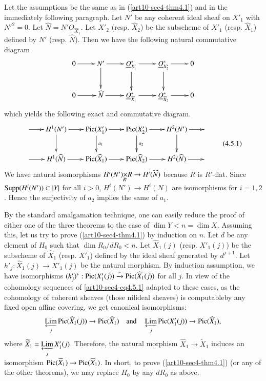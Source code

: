 \begin{remark}\label{art10-sec4-rem4.5}
Let the assumptions be the same as in (\ref{art10-sec4-thm4.1}) and in the immediately following paragraph. Let $N'$ be any coherent ideal sheaf on $X'_{1}$ with ${N'}^{2}=0$. Let $\widehat{N}=N'\underline{O}_{\widehat{X}_{1}}$. Let $X'_{2}$ (resp. $\widehat{X}_{2}$) be the subscheme of $X'_{1}$ (resp. $\widehat{X}_{1}$) defined by $N'$ (resp. $\widehat{N}$). Then we have the following natural commutative diagram
\[
\xymatrix{
0\ar[r] & N'\ar[d] \ar[r] & \underline{O}^{*}_{X'_{1}}\ar[d] \ar[r] & \underline{O}^{*}_{X'_{2}}\ar[d]\ar[r] & 0\\
0\ar[r] & \widehat{N}\ar[r] & \underline{O}^{*}_{\widehat{X}_{1}}\ar[r] & \underline{O}^{*}_{\widehat{X}_{2}}\ar[r] & 0
}
\]
which yields the following exact and commutative diagram.
\begin{equation*}
\vcenter{\xymatrix@C=.72cm{
\ar[r] & H^{1}(N')\ar[d]\ar[r] & \Pic(X'_{1})\ar[d]^-{a_{1}}\ar[r] & \Pic(X'_{2})\ar[d]^-{a_{2}}\ar[r] & H^{2}(N')\ar[d]\ar[r] &\\
\ar[r] & H^{1}(\widehat{N})\ar[r] & \Pic(\widehat{X}_{1})\ar[r] & \Pic(\widehat{X}_{2})\ar[r] & H^{2}(\widehat{N})\ar[r] & 
}}\tag{4.5.1}\label{art10-sec4-eq4.5.1}
\end{equation*}
We have natural isomorphisms $\fprod{H^{i}(N')}{R}{R'}\to H^{i}(\widehat{N})$ because $R$ is $R'$-flat. Since $\operatorname{\mathrm{Supp}} (H^{i}(N'))\subset |Y|$ for all $i>0$, $H^{i}(N')\to H^{i}(N)$ are isomorphisms for $i=1,2$. Hence the surjectivity of $a_{2}$ implies the same of $a_{1}$.
\end{remark}

\begin{remark}\label{art10-sec4-rem4.6}
By the standard amalgamation technique, one can easily reduce the proof of either one of the three theorems to the case of $\dim Y<n=\dim X$. Assuming this, let us try to prove (\ref{art10-sec4-thm4.1}) by induction on $n$. Let $d$ be any element of $H_{0}$ such that $\dim R_{0}/dR_{0}<n$. Let $\widehat{X}_{1}(j)$ (resp. $X'_{1}(j)$) be the subscheme of $\widehat{X}_{1}$ (resp. $X'_{1}$) defined by the ideal sheaf generated by $d^{j+1}$. Let $h'_{j}:\widehat{X}_{1}(j)\to X'_{1}(j)$ be the natural morphism. By induction assumption, we have isomorphisms $(h'_{j})^{*}:\operatorname{\mathrm{Pic}}(X'_{1}(j))\xrightarrow{\sim}\operatorname{\mathrm{Pic}}(\widehat{X}_{1}(j))$ for all $j$. In view of the cohomology sequences of \eqref{art10-sec4-eq4.5.1} adapted to these cases, as the cohomology of coherent sheaves (those nilideal sheaves) is computable\pageoriginale by any fixed open affine covering, we get canonical isomorphisms:
$$
\operatorname*{\underleftarrow{\mathrm{Lim}}}\limits_{j} \operatorname{\mathrm{Pic}}(\widehat{X}_{1}(j))\to \operatorname{\mathrm{Pic}} (\widehat{X}_{1})\quad\text{and}\quad \operatorname*{\underleftarrow{\mathrm{Lim}}}_{j}\operatorname{\mathrm{Pic}} (X'_{1}(j))\to \operatorname{\mathrm{Pic}}(\widehat{X}_{1}),
$$
where $\widetilde{X}_{1}=\operatorname*{\underleftarrow{\mathrm{Lim}}}\limits_{j}X'_{1}(j)$. Therefore, the natural morphism $\widehat{X}_{1}\to \widetilde{X}_{1}$ induces an isomorphism $\operatorname{\mathrm{Pic}} (\widetilde{X}_{1})\to \operatorname{\mathrm{Pic}}(\widehat{X}_{1})$. In short, to prove (\ref{art10-sec4-thm4.1}) (or any of the other theorems), we may replace $H_{0}$ by any $dR_{0}$ as above.
\end{remark}

